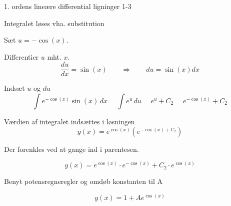 \documentclass{article}
\begin{document}
\begin{exercise}{1. ordens lineære differential ligninger 1-3}
	\hint
	
	Integralet løses vha. substitution
	
	
	\hint
	Sæt $u = - \cos(x)$.
	
	\hint
	
	Differentier $u$ mht. $x$.
	\[
	\frac{du}{dx} = \sin(x) \qquad	\Rightarrow \qquad du = \sin(x) dx
	\]
	
	\hint 
	Indsæt $u$ og $du$
	\[
	\int e^{- \cos(x)} \sin(x) \, dx = \int e^{u} \, du = e^{u} + C_2 = e^{- \cos(x)} + C_2
	\]
	
	\hint
	
	Værdien af integralet indsættes i løsningen
	\[
	y(x) = e^{\cos(x)} \left( e^{- \cos(x) + C_2}\right)
	\]
	
	\hint
	
	Der forenkles ved at gange ind i parentesen.
	
	\hint
	\[
	y(x) = e^{\cos(x)} \cdot e^{- \cos(x)} + C_2 \cdot e^{\cos(x)} 
	\]
	
	\hint
	
	Benyt potensregneregler og omdøb konstanten til A
	
	\hint
	\[
	y(x) = 1 + A e^{\cos(x)}
	\]
	
	
\end{exercise}

\newpage
\end{document}
